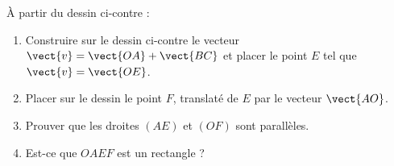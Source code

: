 
\begin{exercice}[\ldots/4]\label{exosmath-0676}

\begin{wrapfigure}{r}{8.0cm}
   \vspace{-0.5cm}        %
   \centering                                                                                                                               
                                                                                                                
\end{wrapfigure}

À partir du dessin ci-contre :
    \begin{enumerate}
        \item
            Construire sur le dessin ci-contre le vecteur \( \vect{ v }=\vect{ OA }+\vect{ BC }\) et placer le point \( E\) tel que \( \vect{ v }=\vect{ OE }\).
        \item
            Placer sur le dessin le point \( F\), translaté de \( E\) par le vecteur \( \vect{ AO }\).
        \item
            Prouver que les droites \( (AE)\) et \( (OF)\) sont parallèles.
        \item
            Est-ce que \( OAEF\) est un rectangle ?
    \end{enumerate}

\end{exercice}
